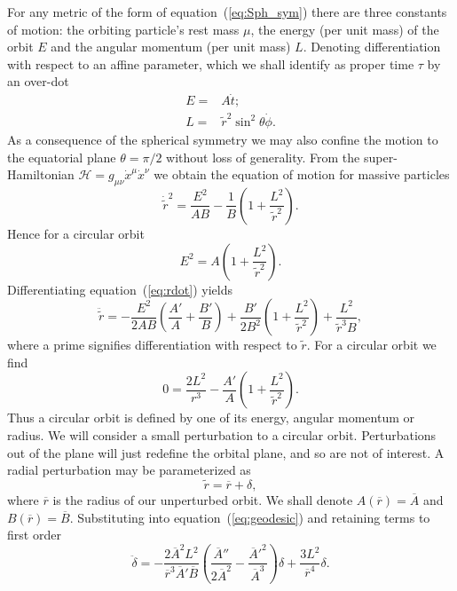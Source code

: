 \documentclass[a4paper, 11pt, titlepage, twoside]{report}
\newcommand{\eqnref}[1]{equation~(\ref{eq:#1})}
\newcommand{\recip}[1]{\ensuremath{\frac{1}{#1}}}
\begin{document}
For any metric of the form of \eqnref{Sph_sym} there are three constants of motion: the orbiting particle's rest mass $\mu$, the energy (per unit mass) of the orbit $E$ and the angular momentum (per unit mass) $L$. Denoting differentiation with respect to an affine parameter, which we shall identify as proper time $\tau$ by an over-dot
\begin{align}
E = {} & A\dot{t}; \\
L = {} & \widetilde{r}^2\sin^2\theta \dot{\phi}.
\end{align}
As a consequence of the spherical symmetry we may also confine the motion to the equatorial plane $\theta = \pi/2$ without loss of generality. From the super-Hamiltonian $\mathcal{H} = g_{\mu\nu}\dot{x}^\mu\dot{x}^\nu$ we obtain the equation of motion for massive particles
\begin{equation}
\dot{\widetilde{r}}^2 = \frac{E^2}{AB} - \recip{B}\left(1 + \frac{L^2}{\widetilde{r}^2}\right).
\label{eq:rdot}
\end{equation}
Hence for a circular orbit
\begin{equation}
E^2 = A\left(1 + \frac{L^2}{\widetilde{r}^2}\right).
\end{equation}
Differentiating \eqnref{rdot} yields
\begin{equation}
\ddot{\widetilde{r}} = -\frac{E^2}{2AB}\left(\frac{A'}{A} + \frac{B'}{B}\right) + \frac{B'}{2B^2}\left(1 + \frac{L^2}{\widetilde{r}^2}\right) + \frac{L^2}{\widetilde{r}^3B},
\label{eq:geodesic}
\end{equation}
where a prime signifies differentiation with respect to $\widetilde{r}$. For a circular orbit we find
\begin{equation}
0 = \frac{2L^2}{r^3} - \frac{A'}{A}\left(1 + \frac{L^2}{\widetilde{r}^2}\right).
\end{equation}
Thus a circular orbit is defined by one of its energy, angular momentum or radius. We will consider a small perturbation to a circular orbit. Perturbations out of the plane will just redefine the orbital plane, and so are not of interest. A radial perturbation may be parameterized as
\begin{equation}
\widetilde{r} = \overline{r} + \delta,
\end{equation}
where $\overline{r}$ is the radius of our unperturbed orbit. We shall denote $A(\overline{r}) = \overline{A}$ and $B(\overline{r}) = \overline{B}$. Substituting into \eqnref{geodesic} and retaining terms to first order
\begin{equation}
\ddot{\delta} = - \frac{2\overline{A}^2L^2}{\overline{r}^3\overline{A}'\overline{B}}\left(\frac{\overline{A}''}{2\overline{A}^2} - \frac{{\overline{A}'}^2}{\overline{A}^3}\right)\delta + \frac{3L^2}{\overline{r}^4}\delta.
\end{equation}
\end{document}
